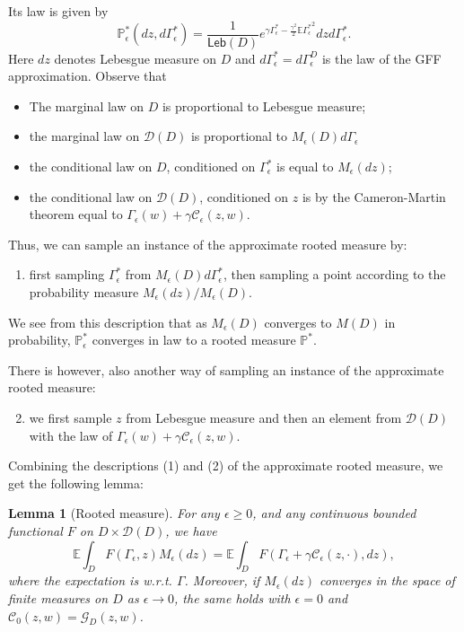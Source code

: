 \documentclass[11pt]{amsart}
\newtheorem{lemma}[thm]{Lemma}
\newcommand{\C}{\mathcal C}
\newcommand{\G}{\mathcal G}
\newcommand{\E}{\mathbb E}
\renewcommand{\P}{\mathbb P}
\renewcommand{\1}{\mathbf 1}
\newcommand{\Leb}{\mathsf{Leb}}
\newcommand{\eps}{\epsilon}
\begin{document}
Its law is given by $$\P^*_\eps(dz,d\Gamma^*_\eps) = \frac{1}{\Leb (D)}e^{\gamma \Gamma^*_\eps - \frac{\gamma^2}{2}\E {\Gamma^*_\eps}^2}dzd\Gamma^*_\eps.$$ Here $dz$ denotes Lebesgue measure on $D$ and $d\Gamma^*_\eps = d\Gamma^D_\eps$ is the law of the GFF approximation. Observe that
\begin{itemize}
\item The marginal law on $D$ is proportional to Lebesgue measure;
\item the marginal law on $\mathcal{D}(D)$ is proportional to $M_\eps(D)d\Gamma_\eps$
\item the conditional law on $D$, conditioned on $\Gamma^*_\eps$ is equal to $M_\eps(dz)$;
\item the conditional law on $\mathcal{D}(D)$, conditioned on $z$ is by the Cameron-Martin theorem equal to $\Gamma_\eps(w) + \gamma \C_\eps(z,w).$
\end{itemize}
Thus, we can sample an instance of the approximate rooted measure by:
\begin{enumerate}
\item first sampling $\Gamma^*_\eps$ from $M_\eps(D)d\Gamma^*_\eps$, then sampling a point according to the probability measure $M_\eps(dz)/M_\eps(D)$.
\end{enumerate}
We see from this description that as $M_\eps(D)$ converges to $M(D)$ in probability, $\P^*_\eps$ converges in law to a rooted measure $\P^*$.  

There is however, also another way of sampling an instance of the approximate rooted measure:
\begin{enumerate}
\setcounter{enumi}{1}
\item we first sample $z$ from Lebesgue measure and then an element from $\mathcal{D}(D)$ with the law of $\Gamma_\eps(w) + \gamma \C_\eps(z,w).$
\end{enumerate}
Combining the descriptions (1) and (2) of the approximate rooted measure, we get the following lemma: 
\begin{lemma}[Rooted measure]\label{lem:rm}
For any $\eps \geq 0$, and any continuous bounded functional $F$ on $D\times \mathcal{D}(D)$, we have
$$\E \int_D F(\Gamma_\eps, z) M_\eps(dz) = \E \int_D F(\Gamma_\eps + \gamma \C_\eps(z,\cdot),dz),$$
where the expectation is w.r.t. $\Gamma$. Moreover, if $M_\eps(dz)$ converges in the space of finite measures on $D$ as $\eps \to 0$, the same holds with $\eps = 0$ and $\C_0(z,w) = \G_D(z,w)$. 
\end{lemma}
\end{document}
